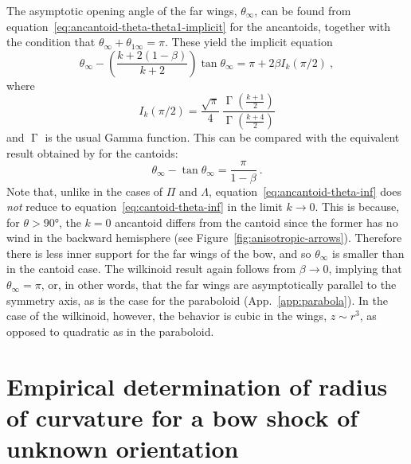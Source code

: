 \documentclass[useAMS, usenatbib, a4paper]{mnras}
\DeclareMathOperator{\GammaFunc}{\Gamma}
\begin{document}
The asymptotic opening angle
of the far wings, \(\theta_\infty\), can be found from
equation~\eqref{eq:ancantoid-theta-theta1-implicit} for the
ancantoids, together with the condition that
\(\theta_\infty + \theta_{1\infty} = \pi\).  These yield the implicit equation
\begin{equation}
  \label{eq:ancantoid-theta-inf}
  \theta_\infty - \left( \frac {k + 2 (1 - \beta)} {k + 2} \right) \tan \theta_\infty
  = \pi + 2 \beta I_k(\pi/2) \ ,
\end{equation}
where
\begin{equation}
  I_k(\pi/2) = \frac{\sqrt \pi}{4} \,
      \frac{  \GammaFunc\left( \frac{k+1}{2} \right)} {\GammaFunc\left(\frac{k+4}{2}\right)}
\end{equation}
and \(\GammaFunc\) is the usual Gamma function.  This can be compared with the equivalent result obtained by \CRW{} for the cantoids:
\begin{equation}
  \label{eq:cantoid-theta-inf}
  \theta_\infty - \tan \theta_\infty = \frac{\pi}{1 - \beta} \ .
\end{equation}
Note that, unlike in the cases of \(\Pi\) and \(\Lambda\),
equation~\eqref{eq:ancantoid-theta-inf} does \emph{not} reduce to
equation~\eqref{eq:cantoid-theta-inf} in the limit \(k \to 0\).  This is
because, for \(\theta > \ang{90}\), the \(k = 0\) ancantoid differs from the
cantoid since the former has no wind in the backward hemisphere (see
Figure~\ref{fig:anisotropic-arrows}).  Therefore there is less inner
support for the far wings of the bow, and so \(\theta_\infty\) is smaller than
in the cantoid case.  The wilkinoid result again follows from
\(\beta \to 0\), implying that \(\theta_\infty = \pi\), or, in other words, that the far
wings are asymptotically parallel to the symmetry axis, as is the case
for the paraboloid (App.~\ref{app:parabola}).  In the case of the
wilkinoid, however, the behavior is cubic in the wings,
\(z \sim r^3\), as opposed to quadratic as in the paraboloid.
\section{Empirical determination of radius of curvature for a bow shock of unknown orientation}
\label{app:rcurv-empirical}
\end{document}
